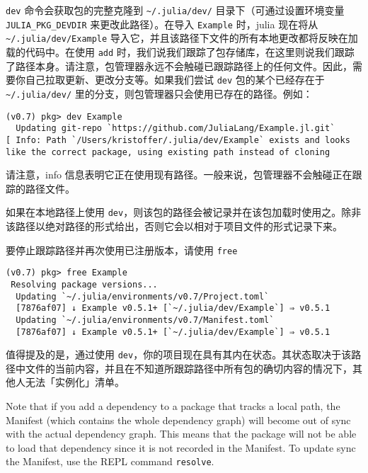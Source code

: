 \texttt{dev} 命令会获取包的完整克隆到 \texttt{{\textasciitilde}/.julia/dev/} 目录下（可通过设置环境变量 \texttt{JULIA\_PKG\_DEVDIR} 来更改此路径）。在导入 \texttt{Example} 时，julia 现在将从 \texttt{{\textasciitilde}/.julia/dev/Example} 导入它，并且该路径下文件的所有本地更改都将反映在加载的代码中。在使用 \texttt{add} 时，我们说我们跟踪了包存储库，在这里则说我们跟踪了路径本身。请注意，包管理器永远不会触碰已跟踪路径上的任何文件。因此，需要你自己拉取更新、更改分支等。如果我们尝试 \texttt{dev} 包的某个已经存在于 \texttt{{\textasciitilde}/.julia/dev/} 里的分支，则包管理器只会使用已存在的路径。例如：




\begin{lstlisting}
(v0.7) pkg> dev Example
  Updating git-repo `https://github.com/JuliaLang/Example.jl.git`
[ Info: Path `/Users/kristoffer/.julia/dev/Example` exists and looks like the correct package, using existing path instead of cloning
\end{lstlisting}



请注意，info 信息表明它正在使用现有路径。一般来说，包管理器不会触碰正在跟踪的路径文件。



如果在本地路径上使用 \texttt{dev}，则该包的路径会被记录并在该包加载时使用之。除非该路径以绝对路径的形式给出，否则它会以相对于项目文件的形式记录下来。



要停止跟踪路径并再次使用已注册版本，请使用 \texttt{free}




\begin{lstlisting}
(v0.7) pkg> free Example
 Resolving package versions...
  Updating `~/.julia/environments/v0.7/Project.toml`
  [7876af07] ↓ Example v0.5.1+ [`~/.julia/dev/Example`] ⇒ v0.5.1
  Updating `~/.julia/environments/v0.7/Manifest.toml`
  [7876af07] ↓ Example v0.5.1+ [`~/.julia/dev/Example`] ⇒ v0.5.1
\end{lstlisting}



值得提及的是，通过使用 \texttt{dev}，你的项目现在具有其内在状态。其状态取决于该路径中文件的当前内容，并且在不知道所跟踪路径中所有包的确切内容的情况下，其他人无法「实例化」清单。



Note that if you add a dependency to a package that tracks a local path, the Manifest (which contains the whole dependency graph) will become out of sync with the actual dependency graph. This means that the package will not be able to load that dependency since it is not recorded in the Manifest. To update sync the Manifest, use the REPL command \texttt{resolve}.




